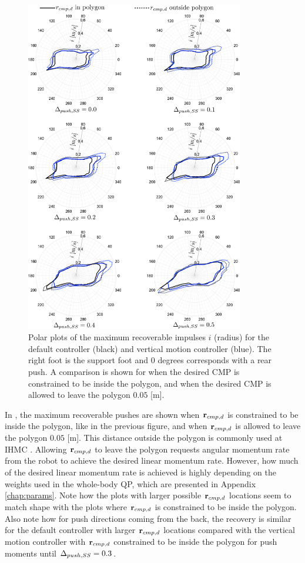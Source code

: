 \begin{figure}
     \centering
        \includegraphics[width=0.85\textwidth]{STYLESTUFF/roundAng.png}
        \caption{Polar plots of the maximum recoverable impulses $i$ (radius) for the default controller (black) and vertical motion controller (blue). The right foot is the support foot and $0$ degrees corresponds with a rear push. A comparison is shown for when the desired \ac{CMP} is constrained to be inside the polygon, and when the desired \ac{CMP} is allowed to leave the polygon $0.05$ [m].}
        \label{fig:roundPushAng}
\end{figure}

In , the maximum recoverable pushes are shown when $\mathbf{r}_{cmp,d}$ is constrained to be inside the polygon, like in the previous figure, and when $\mathbf{r}_{cmp,d}$ is allowed to leave the polygon $0.05$ [m]. This distance outside the polygon is commonly used at \ac{IHMC} \cite{griffin2017natural}. Allowing $\mathbf{r}_{cmp,d}$ to leave the polygon requests angular momentum rate from the robot to achieve the desired linear momentum rate. However, how much of the desired linear momentum rate is achieved is highly depending on the weights used in the whole-body \ac{QP}, which are presented in Appendix \ref{chap:params}. Note how the plots with larger possible $\mathbf{r}_{cmp,d}$ locations seem to match shape with the plots where $\mathbf{r}_{cmp,d}$ is constrained to be inside the polygon. Also note how for push directions coming from the back, the recovery is similar for the default controller with larger $\mathbf{r}_{cmp,d}$ locations compared with the vertical motion controller with $\mathbf{r}_{cmp,d}$ constrained to be inside the polygon for push moments until $\Delta_{push,SS}=0.3$. 


